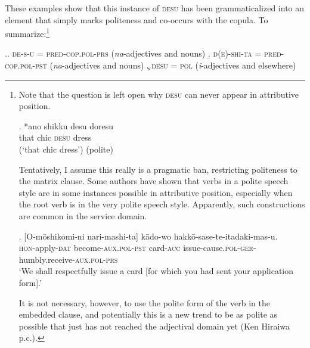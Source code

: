 \largerpage[2]
These examples show that this instance of \textsc{desu} has been grammaticalized into an element that simply marks politeness and co-occurs with the copula. To summarize:\footnote{Note that the question is left open why \textsc{desu} can never appear in attributive position.

\par

\exg. *ano shikku desu doresu\\
that chic \textsc{desu} dress\\
(`that chic dress’) (polite)

\par

Tentatively, I assume this really is a pragmatic ban, restricting politeness to the matrix clause. Some authors \citep{horie:2017:attributive} have shown that verbs in a polite speech style are in some instances possible in attributive position, especially when the root verb is in the very polite speech style. Apparently, such constructions are common in the service domain.

\par

\exg. [O-mōshikomi-ni nari-mashi-ta] kādo-wo hakkō-sase-te-itadaki-mas-u.\\
\textsc{hon}-apply-\textsc{dat} become-\textsc{aux.pol-pst} card-\textsc{acc} issue-cause.\textsc{pol}-\textsc{ger}-humbly.receive-\textsc{aux.pol-prs}\\
`We shall respectfully issue a card [for which you had sent your application form].’ \\ \null \hfill \citep[51]{horie:2017:attributive}

\par

It is not necessary, however, to use the polite form of the verb in the embedded clause, and potentially this is a new trend to be as polite as possible that just has not reached the adjectival domain yet (Ken Hiraiwa p.c.).}

%

\ex.\a. \textsc{de-s-u} = \textsc{pred-cop.pol-prs} (\textit{na}-adjectives and nouns)
\b. \textsc{d(e)-shi-ta} = \textsc{pred-cop.pol-pst} (\textit{na}-adjectives and nouns)
\c. \textsc{desu} = \textsc{pol} (\textit{i}-adjectives and elsewhere)


